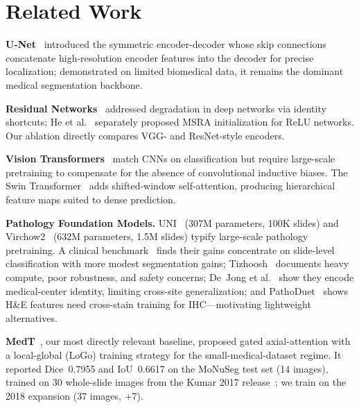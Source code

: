 \documentclass[runningheads]{llncs}
\begin{document}
\section{Related Work}

\noindent\textbf{U-Net}~\cite{ronneberger2015unet} introduced the symmetric encoder-decoder whose skip connections concatenate high-resolution encoder features into the decoder for precise localization; demonstrated on limited biomedical data, it remains the dominant medical segmentation backbone.

\noindent\textbf{Residual Networks}~\cite{he2016resnet} addressed degradation in deep networks via identity shortcuts; He et al.~\cite{he2015msra} separately proposed MSRA initialization for ReLU networks. Our ablation directly compares VGG- and ResNet-style encoders.

\noindent\textbf{Vision Transformers}~\cite{dosovitskiy2020vit} match CNNs on classification but require large-scale pretraining to compensate for the absence of convolutional inductive biases. The Swin Transformer~\cite{liu2021swin} adds shifted-window self-attention, producing hierarchical feature maps suited to dense prediction.

\noindent\textbf{Pathology Foundation Models.} UNI~\cite{chen2024uni} (307M parameters, 100K slides) and Virchow2~\cite{vorontsov2024virchow} (632M parameters, 1.5M slides) typify large-scale pathology pretraining. A clinical benchmark~\cite{campanella2025clinical} finds their gains concentrate on slide-level classification with more modest segmentation gains; Tizhoosh~\cite{tizhoosh2025why} documents heavy compute, poor robustness, and safety concerns; De~Jong et al.~\cite{dejong2025current} show they encode medical-center identity, limiting cross-site generalization; and PathoDuet~\cite{hua2024pathoduet} shows H\&E features need cross-stain training for IHC---motivating lightweight alternatives.

\noindent\textbf{MedT}~\cite{valanarasu2021medt}, our most directly relevant baseline, proposed gated axial-attention with a local-global (LoGo) training strategy for the small-medical-dataset regime. It reported Dice~0.7955 and IoU~0.6617 on the MoNuSeg test set (14 images), trained on 30 whole-slide images from the Kumar 2017 release~\cite{kumar2017monuseg}; we train on the 2018 expansion (37 images, $+$7).
\end{document}
